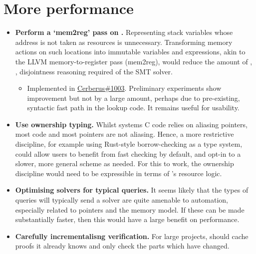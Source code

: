 \section{More performance}

\begin{itemize}
    \item \textbf{Perform a `mem2reg' pass on .} Representing stack
        variables whose address is not taken as resources is unnecessary.
        Transforming memory actions on such locations into immutable 
        variables and expressions, akin to the LLVM memory-to-register
        pass (mem2reg), would reduce the amount of ,
        , disjointness reasoning required of the SMT solver.
        \begin{itemize}
            \item Implemented in
                \href{https://github.com/rems-project/cerberus/pull/1003}{Cerberus\#1003}.
                Preliminary experiments show improvement but not by a large
                amount, perhaps due to pre-existing, syntactic fast path in the
                 lookup code. It remains useful for usability.
        \end{itemize}
    \item \textbf{Use ownership typing.} Whilst  systems C code relies
        on aliasing pointers, most code and most pointers are not aliasing. Hence,
        a more restrictive discipline, for example using Rust-style
        borrow-checking as a type
        system,
        could allow users to benefit from fast checking by default, and opt-in to a slower,
        more general scheme as needed. For this to work, the ownership
        discipline would need to be expressible in terms of 's resource
        logic.
    \item \textbf{Optimising solvers for typical queries.} It seems
        likely that the types of queries  will typically send a
        solver are quite amenable to automation, especially related
        to pointers and the  memory model. If these can be
        made substantially faster, then this would have a large
        benefit on  performance.
    \item \textbf{Carefully incrementalisng verification.} For large projects,
         should cache proofs it already knows and only check the parts
        which have changed.
\end{itemize}


